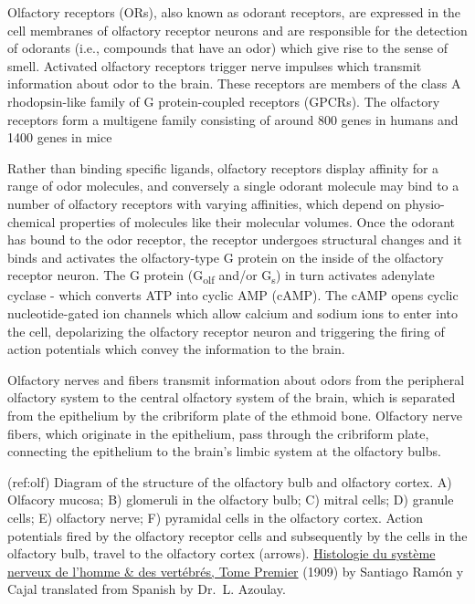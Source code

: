 Olfactory receptors (ORs), also known as odorant receptors, are
expressed in the cell membranes of olfactory receptor neurons and are
responsible for the detection of odorants (i.e., compounds that have an
odor) which give rise to the sense of smell. Activated olfactory
receptors trigger nerve impulses which transmit information about odor
to the brain. These receptors are members of the class A rhodopsin-like
family of G protein-coupled receptors (GPCRs). The olfactory receptors
form a multigene family consisting of around 800 genes in humans and
1400 genes in mice

Rather than binding specific ligands, olfactory receptors display
affinity for a range of odor molecules, and conversely a single odorant
molecule may bind to a number of olfactory receptors with varying
affinities, which depend on physio-chemical properties of molecules like
their molecular volumes. Once the odorant has bound to the odor
receptor, the receptor undergoes structural changes and it binds and
activates the olfactory-type G protein on the inside of the olfactory
receptor neuron. The G protein (G\textsubscript{olf} and/or
G\textsubscript{s}) in turn activates adenylate cyclase - which converts
ATP into cyclic AMP (cAMP). The cAMP opens cyclic nucleotide-gated ion
channels which allow calcium and sodium ions to enter into the cell,
depolarizing the olfactory receptor neuron and triggering the firing of
action potentials which convey the information to the brain.

Olfactory nerves and fibers transmit information about odors from the
peripheral olfactory system to the central olfactory system of the
brain, which is separated from the epithelium by the cribriform plate of
the ethmoid bone. Olfactory nerve fibers, which originate in the
epithelium, pass through the cribriform plate, connecting the epithelium
to the brain's limbic system at the olfactory bulbs.

(ref:olf) Diagram of the structure of the olfactory bulb and olfactory
cortex. A) Olfacory mucosa; B) glomeruli in the olfactory bulb; C)
mitral cells; D) granule cells; E) olfactory nerve; F) pyramidal cells
in the olfactory cortex. Action potentials fired by the olfactory
receptor cells and subsequently by the cells in the olfactory bulb,
travel to the olfactory cortex (arrows).
\href{https://wellcomelibrary.org/item/b2129592x\#?c=0\&m=0\&s=0\&cv=14\&z=0\%2C-3.48\%2C1\%2C8.6591}{Histologie
du système nerveux de l'homme \& des vertébrés, Tome Premier} (1909) by
Santiago Ramón y Cajal translated from Spanish by Dr.~L. Azoulay.

